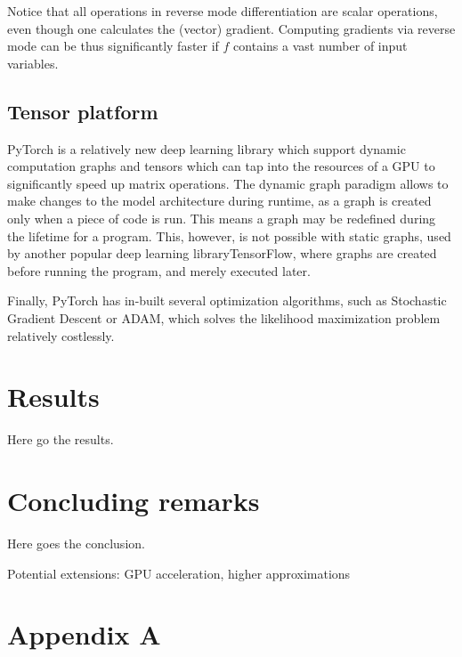 \documentclass{pracamgr}
\numberwithin{equation}{section}
\begin{document}
Notice that  all operations in reverse mode differentiation are scalar operations, even though one calculates the (vector) gradient. Computing gradients via reverse mode can be thus significantly faster if $f$ contains a vast number of input variables.

\section{Tensor platform}

PyTorch is a relatively new deep learning library which support dynamic computation graphs and tensors which can tap into the resources of a GPU to significantly speed up matrix operations. The dynamic graph paradigm allows to make changes to the model architecture during runtime, as a graph is created only when a piece of code is run. This means a graph may be redefined during the lifetime for a program. This, however, is not possible with static graphs, used by another popular deep learning libraryTensorFlow, where graphs are created before running the program, and merely executed later. 

Finally, PyTorch has in-built several optimization algorithms, such as Stochastic Gradient Descent or ADAM, which solves the likelihood maximization problem relatively costlessly.

\chapter{Results}

Here go the results.


\chapter{Concluding remarks} \label{Concluding remarks}

Here goes the conclusion.

Potential extensions: GPU acceleration, higher approximations

\newpage

\nocite{*}


\newpage

\chapter*{Appendix A} \label{Appendix A}
\end{document}
